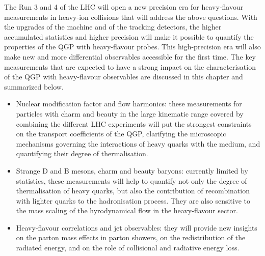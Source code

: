 The Run 3 and 4 of the LHC will open a new precision era for heavy-flavour measurements in heavy-ion collisions that will address the above questions.
With the upgrades of the machine and of the tracking detectors, the higher accumulated statistics and higher precision will make it possible to quantify the properties of the QGP with heavy-flavour probes. This high-precision era will also make new and more differential observables accessible for the first time.
The key measurements that are expected to have a strong impact on the characterisation of the QGP with heavy-flavour observables are discussed in this chapter and summarized below.
\begin{itemize}
\item Nuclear modification factor and flow harmonics: these measurements for particles with charm and beauty in the large kinematic range covered by combining the different LHC experiments will put the strongest constraints on the transport coefficients of the QGP, clarifying the microscopic mechanisms governing the interactions of heavy quarks with the medium, and quantifying their degree of thermalisation.
\item Strange D and B mesons, charm and beauty baryons: currently limited by statistics, these measurements will help to quantify not only the degree of thermalisation of heavy quarks, but also the contribution of recombination with lighter quarks to the hadronisation process. They are also sensitive to the mass scaling of the hyrodynamical flow in the heavy-flavour sector.
\item Heavy-flavour correlations and jet observables: they will provide new insights on the parton mass effects in parton showers, on the redistribution of the radiated energy, and on the role of collisional and radiative energy loss.

\end{itemize}


